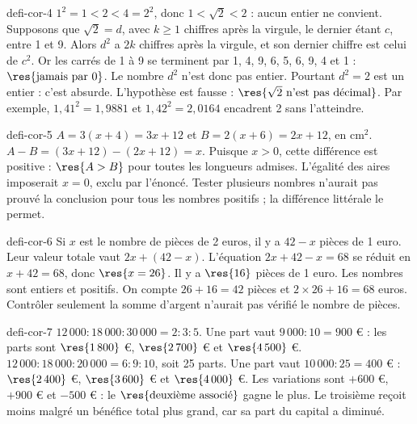 \begin{blocEdition}{defi-cor-4}
$1^2=1<2<4=2^2$, donc $1<\sqrt2<2$ : aucun entier ne convient.
Supposons que $\sqrt2=d$, avec $k\ge1$ chiffres après la virgule, le dernier étant $c$, entre 1 et 9. Alors $d^2$ a $2k$ chiffres après la virgule, et son dernier chiffre est celui de $c^2$. Or les carrés de 1 à 9 se terminent par 1, 4, 9, 6, 5, 6, 9, 4 et 1 : $\res{\text{jamais par 0}}$. Le nombre $d^2$ n’est donc pas entier.
Pourtant $d^2=2$ est un entier : c’est absurde. L’hypothèse est fausse : $\res{\sqrt2\text{ n’est pas décimal}}$. Par exemple, $1{,}41^2=1{,}9881$ et $1{,}42^2=2{,}0164$ encadrent 2 sans l’atteindre.\label{fig-defi-cor-4}

\end{blocEdition}
\begin{blocEdition}{defi-cor-5}
$A=3(x+4)=3x+12$ et $B=2(x+6)=2x+12$, en cm$^2$.
$A-B=(3x+12)-(2x+12)=x$. Puisque $x>0$, cette différence est positive : $\res{A>B}$ pour toutes les longueurs admises.
L’égalité des aires imposerait $x=0$, exclu par l’énoncé. Tester plusieurs nombres n’aurait pas prouvé la conclusion pour tous les nombres positifs ; la différence littérale le permet.\label{fig-defi-cor-5}

\end{blocEdition}
\begin{blocEdition}{defi-cor-6}
Si $x$ est le nombre de pièces de 2 euros, il y a $42-x$ pièces de 1 euro. Leur valeur totale vaut $2x+(42-x)$.
L’équation $2x+42-x=68$ se réduit en $x+42=68$, donc $\res{x=26}$. Il y a $\res{16}$ pièces de 1 euro.
Les nombres sont entiers et positifs. On compte $26+16=42$ pièces et $2\times26+16=68$ euros. Contrôler seulement la somme d’argent n’aurait pas vérifié le nombre de pièces.
\end{blocEdition}
\begin{blocEdition}{defi-cor-7}
$12\,000:18\,000:30\,000=2:3:5$. Une part vaut $9\,000:10=900$ € : les parts sont $\res{1\,800}$ €, $\res{2\,700}$ € et $\res{4\,500}$ €.
$12\,000:18\,000:20\,000=6:9:10$, soit 25 parts. Une part vaut $10\,000:25=400$ € : $\res{2\,400}$ €, $\res{3\,600}$ € et $\res{4\,000}$ €.
Les variations sont $+600$ €, $+900$ € et $-500$ € : le $\res{\text{deuxième associé}}$ gagne le plus. Le troisième reçoit moins malgré un bénéfice total plus grand, car sa part du capital a diminué.
\end{blocEdition}
